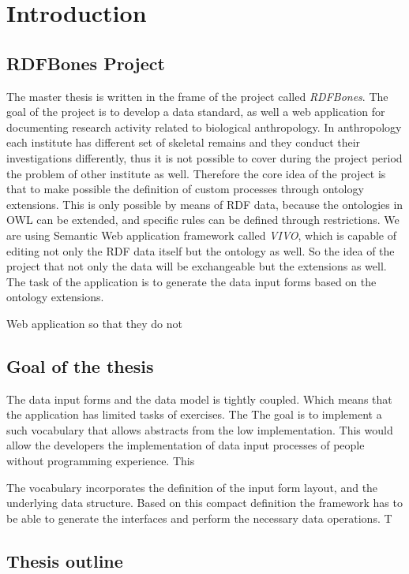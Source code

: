 \chapter{Introduction}


\section{RDFBones Project}

The master thesis is written in the frame of the project called \textit{RDFBones}. The goal of the project is to develop a data standard, as well a web application for documenting research activity related to biological anthropology. In anthropology each institute has different set of skeletal remains and they conduct their investigations differently, thus it is not possible to cover during the project period the problem of other institute as well. Therefore the core idea of the project is that to make possible the definition of custom processes through ontology extensions. This is only possible by means of RDF data, because the ontologies in OWL can be extended, and specific rules can be defined through restrictions.
We are using Semantic Web application framework called \textit{VIVO}, which is capable of editing not only the RDF data itself but the ontology as well. So the idea of the project that not only the data will be exchangeable but the extensions as well.
The task of the application is to generate the data input forms based on the ontology extensions. 

Web application so that they do not 



\section{Goal of the thesis}


The data input forms and the data model is tightly coupled. Which means that the application has limited tasks of exercises. The 
The goal is to implement a such vocabulary that allows abstracts from the low implementation. This would allow the developers 
the implementation of data input processes of people without programming experience. This

The vocabulary incorporates the definition of the input form layout, and the underlying data structure. Based on this compact definition
the framework has to be able to generate the interfaces and perform the necessary data operations.
T

\section{Thesis outline}


